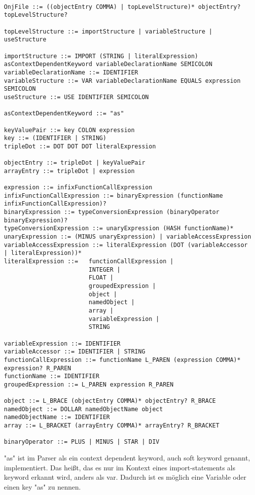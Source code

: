 \begin{verbatim}
    
OnjFile ::= ((objectEntry COMMA) | topLevelStructure)* objectEntry? topLevelStructure?

topLevelStructure ::= importStructure | variableStructure | useStructure

importStructure ::= IMPORT (STRING | literalExpression) asContextDependentKeyword variableDeclarationName SEMICOLON
variableDeclarationName ::= IDENTIFIER
variableStructure ::= VAR variableDeclarationName EQUALS expression SEMICOLON
useStructure ::= USE IDENTIFIER SEMICOLON

asContextDependentKeyword ::= "as"

keyValuePair ::= key COLON expression
key ::= (IDENTIFIER | STRING)
tripleDot ::= DOT DOT DOT literalExpression

objectEntry ::= tripleDot | keyValuePair
arrayEntry ::= tripleDot | expression

expression ::= infixFunctionCallExpression
infixFunctionCallExpression ::= binaryExpression (functionName infixFunctionCallExpression)?
binaryExpression ::= typeConversionExpression (binaryOperator binaryExpression)?
typeConversionExpression ::= unaryExpression (HASH functionName)*
unaryExpression ::= (MINUS unaryExpression) | variableAccessExpression
variableAccessExpression ::= literalExpression (DOT (variableAccessor | literalExpression))*
literalExpression ::=   functionCallExpression |
                        INTEGER |
                        FLOAT |
                        groupedExpression |
                        object |
                        namedObject |
                        array |
                        variableExpression |
                        STRING

variableExpression ::= IDENTIFIER
variableAccessor ::= IDENTIFIER | STRING
functionCallExpression ::= functionName L_PAREN (expression COMMA)* expression? R_PAREN
functionName ::= IDENTIFIER
groupedExpression ::= L_PAREN expression R_PAREN

object ::= L_BRACE (objectEntry COMMA)* objectEntry? R_BRACE
namedObject ::= DOLLAR namedObjectName object
namedObjectName ::= IDENTIFIER
array ::= L_BRACKET (arrayEntry COMMA)* arrayEntry? R_BRACKET

binaryOperator ::= PLUS | MINUS | STAR | DIV

\end{verbatim}

\begin{infoBox}
    "as" ist im Parser als ein context dependent keyword, auch soft keyword genannt, implementiert.
    Das heißt, das es nur im Kontext eines import-statements als keyword erkannt wird, anders als \zB var.
    Dadurch ist es möglich eine Variable oder einen key "as" zu nennen.
\end{infoBox}

\renewcommand{\kapitelautor}{}
